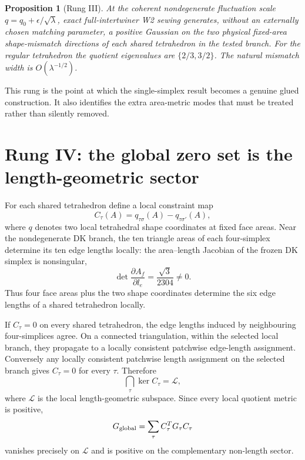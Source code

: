 \documentclass[11pt]{article}
\numberwithin{equation}{section}
\newtheorem{proposition}[theorem]{Proposition}
\begin{document}
\begin{proposition}[Rung III]
At the coherent nondegenerate fluctuation scale $q=q_0+\epsilon/\sqrt\lambda$, exact full-intertwiner W2 sewing generates, without an externally chosen matching parameter, a positive Gaussian on the two physical fixed-area shape-mismatch directions of each shared tetrahedron in the tested branch. For the regular tetrahedron the quotient eigenvalues are $\{2/3,3/2\}$. The natural mismatch width is $O(\lambda^{-1/2})$.
\end{proposition}

This rung is the point at which the single-simplex result becomes a genuine glued construction. It also identifies the extra area-metric modes that must be treated rather than silently removed.

\section{Rung IV: the global zero set is the length-geometric sector}\label{sec:r4}

For each shared tetrahedron define a local constraint map
\begin{equation}
  C_\tau(A)=q_{\tau\sigma}(A)-q_{\tau\sigma'}(A),
\end{equation}
where $q$ denotes two local tetrahedral shape coordinates at fixed face areas. Near the nondegenerate DK branch, the ten triangle areas of each four-simplex determine its ten edge lengths locally: the area--length Jacobian of the frozen DK simplex is nonsingular,
\begin{equation}
  \det\frac{\partial A_f}{\partial l_e}=\frac{\sqrt3}{2304}\neq0.
\end{equation}
Thus four face areas plus the two shape coordinates determine the six edge lengths of a shared tetrahedron locally.

If $C_\tau=0$ on every shared tetrahedron, the edge lengths induced by neighbouring four-simplices agree. On a connected triangulation, within the selected local branch, they propagate to a locally consistent patchwise edge-length assignment. Conversely any locally consistent patchwise length assignment on the selected branch gives $C_\tau=0$ for every $\tau$. Therefore
\begin{equation}\label{eq:kernel}
  \bigcap_\tau\ker C_\tau=\mathcal L,
\end{equation}
where $\mathcal L$ is the local length-geometric subspace. Since every local quotient metric is positive,
\begin{equation}
  G_{\rm global}=\sum_\tau C_\tau^T G_\tau C_\tau
\end{equation}
vanishes precisely on $\mathcal L$ and is positive on the complementary non-length sector.
\end{document}
